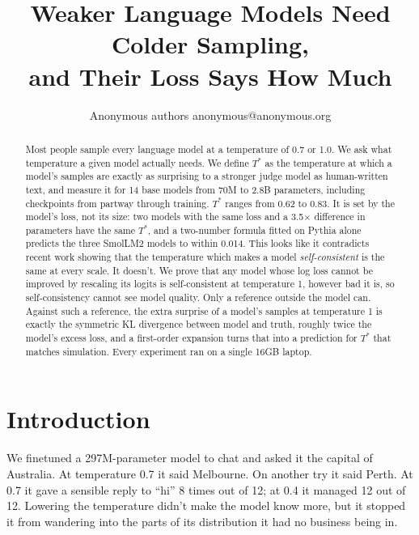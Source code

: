 \documentclass[10pt]{article}
\title{Weaker Language Models Need Colder Sampling,\\and Their Loss Says How Much}
\author{\name Anonymous authors \email anonymous@anonymous.org}
\newcommand{\Ts}{T^{*}}
\begin{document}
\maketitle

\begin{center}
\end{center}

\begin{abstract}
Most people sample every language model at a temperature of 0.7 or 1.0. We ask what temperature a given model actually needs. We define $\Ts$ as the temperature at which a model's samples are exactly as surprising to a stronger judge model as human-written text, and measure it for 14 base models from 70M to 2.8B parameters, including checkpoints from partway through training. $\Ts$ ranges from 0.62 to 0.83. It is set by the model's loss, not its size: two models with the same loss and a 3.5$\times$ difference in parameters have the same $\Ts$, and a two-number formula fitted on Pythia alone predicts the three SmolLM2 models to within 0.014. This looks like it contradicts recent work showing that the temperature which makes a model \emph{self-consistent} is the same at every scale. It doesn't. We prove that any model whose log loss cannot be improved by rescaling its logits is self-consistent at temperature 1, however bad it is, so self-consistency cannot see model quality. Only a reference outside the model can. Against such a reference, the extra surprise of a model's samples at temperature 1 is exactly the symmetric KL divergence between model and truth, roughly twice the model's excess loss, and a first-order expansion turns that into a prediction for $\Ts$ that matches simulation. Every experiment ran on a single 16GB laptop.
\end{abstract}

\section{Introduction}
\label{sec:intro}

We finetuned a 297M-parameter model to chat and asked it the capital of Australia. At temperature 0.7 it said Melbourne. On another try it said Perth. At 0.7 it gave a sensible reply to ``hi'' 8 times out of 12; at 0.4 it managed 12 out of 12. Lowering the temperature didn't make the model know more, but it stopped it from wandering into the parts of its distribution it had no business being in.
\end{document}
